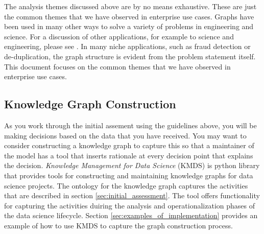 \documentclass{article}
\begin{document}
The analysis themes discussed above are by no means exhaustive. These are just the common themes that we have observed in enterprise use cases. Graphs have been used in many other ways to solve a variety of problems in engineering and science. For a discussion of other applications, for example to science and engineering, please see \cite{cook2006mining}. In many niche applications, such as fraud detection or de-duplication, the graph structure is evident from the problem statement itself. This document focuses on the common themes that we have observed in enterprise use cases.

\subsection{Knowledge Graph Construction}
As you work through the initial assement using the guidelines above, you will be making decisions based on the data that you have received. You may want to consider constructing a knowledge graph to capture this so that a maintainer of the model has a tool that inserts rationale at every decision point that explains the decision. \emph{Knowledge Management for Data Science} (KMDS) \cite{kmds2025} is python library that provides tools for constructing and maintaining knowledge graphs for data science projects. The ontology for the knowledge graph captures the activities that are described in section \ref{sec:initial_assessment}. The tool offers functionality for capturing the activities duiring the analysis and operationalization phases of the data science lifecycle. Section \ref{sec:examples_of_implementation} provides an example of how to use KMDS to capture the graph construction process.
\end{document}
